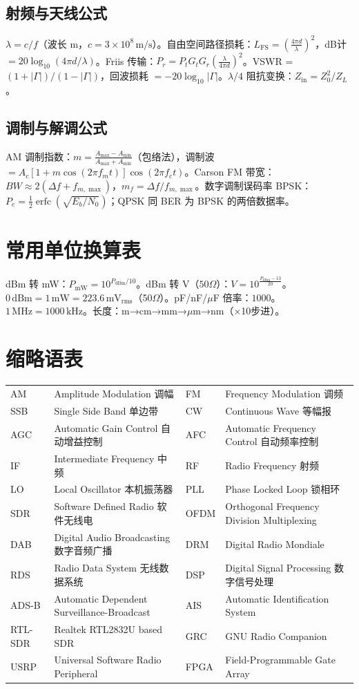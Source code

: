 \documentclass[12pt,UTF8]{ctexbook}
\begin{document}
\section{射频与天线公式}
$\lambda = c/f$（波长 m，$c=3\times10^8\,\mathrm{m/s}$）。自由空间路径损耗：$L_{\mathrm{FS}}=(\frac{4\pi d}{\lambda})^2$，dB计 $= 20\log_{10}(4\pi d/\lambda)$。Friis 传输：$P_r = P_t G_t G_r (\frac{\lambda}{4\pi d})^2$。VSWR = $(1+|\Gamma|)/(1-|\Gamma|)$，回波损耗 $=-20\log_{10}|\Gamma|$。$\lambda/4$ 阻抗变换：$Z_{\mathrm{in}}=Z_0^2/Z_L$。

\section{调制与解调公式}
AM 调制指数：$m = \frac{A_{\max}-A_{\min}}{A_{\max}+A_{\min}}$（包络法），调制波 $= A_c[1+m \cos(2\pi f_m t)]\cos(2\pi f_c t)$。Carson FM 带宽：$BW \approx 2(\Delta f + f_{m,\max})$，$m_f=\Delta f/f_{m,\max}$。数字调制误码率 BPSK：$P_e=\frac12\operatorname{erfc}(\sqrt{E_b/N_0})$；QPSK 同 BER 为 BPSK 的两倍数据率。

\chapter{常用单位换算表}
dBm 转 mW：$P_{\mathrm{mW}}=10^{P_{\mathrm{dBm}}/10}$。dBm 转 V（$50\Omega$）：$V=10^{\frac{P_{\mathrm{dBm}}-13}{20}}$。$0\,\mathrm{dBm}=1\,\mathrm{mW}=223.6\,\mathrm{mV_{rms}}$（50$\Omega$）。pF/nF/$\mu$F 倍率：$1000$。$1\,\mathrm{MHz}=1000\,\mathrm{kHz}$。长度：m→cm→mm→$\mu$m→nm（×10步进）。

\chapter{缩略语表}
\begin{tabular}{ll|ll}
AM & Amplitude Modulation 调幅 & FM & Frequency Modulation 调频 \\
SSB & Single Side Band 单边带 & CW & Continuous Wave 等幅报 \\
AGC & Automatic Gain Control 自动增益控制 & AFC & Automatic Frequency Control 自动频率控制 \\
IF & Intermediate Frequency 中频 & RF & Radio Frequency 射频 \\
LO & Local Oscillator 本机振荡器 & PLL & Phase Locked Loop 锁相环 \\
SDR & Software Defined Radio 软件无线电 & OFDM & Orthogonal Frequency Division Multiplexing \\
DAB & Digital Audio Broadcasting 数字音频广播 & DRM & Digital Radio Mondiale \\
RDS & Radio Data System 无线数据系统 & DSP & Digital Signal Processing 数字信号处理 \\
ADS-B & Automatic Dependent Surveillance-Broadcast & AIS & Automatic Identification System \\
RTL-SDR & Realtek RTL2832U based SDR & GRC & GNU Radio Companion \\
USRP & Universal Software Radio Peripheral & FPGA & Field-Programmable Gate Array \\
\end{tabular}
\end{document}

